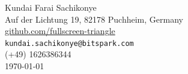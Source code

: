\documentclass[11pt,a4paper]{article}
\begin{document}
\begin{flushright}
Kundai Farai Sachikonye \\
Auf der Lichtung 19, 82178 Puchheim, Germany \\
\href{https://github.com/fullscreen-triangle}{github.com/fullscreen-triangle} \\
\texttt{kundai.sachikonye@bitspark.com} \\
(+49) 1626386344 \\[6pt]
\today
\end{flushright}


\end{document}
